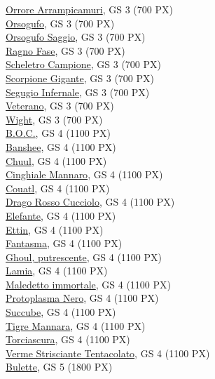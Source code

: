 \begin{multicols}{3}
{\hyperlink{Orrore Arrampicamuri}{Orrore Arrampicamuri}, GS 3 (700 PX)\\
\hyperlink{Orsogufo}{Orsogufo}, GS 3 (700 PX)\\
\hyperlink{Orsogufo Saggio}{Orsogufo Saggio}, GS 3 (700 PX)\\
\hyperlink{Ragno Fase}{Ragno Fase}, GS 3 (700 PX)\\
\hyperlink{Scheletro Campione}{Scheletro Campione}, GS 3 (700 PX)\\
\hyperlink{Scorpione Gigante}{Scorpione Gigante}, GS 3 (700 PX)\\
\hyperlink{Segugio Infernale}{Segugio Infernale}, GS 3 (700 PX)\\
\hyperlink{Veterano}{Veterano}, GS 3 (700 PX)\\
\hyperlink{Wight}{Wight}, GS 3 (700 PX)\\
\hyperlink{B.O.C.}{B.O.C.}, GS 4 (1100 PX)\\
\hyperlink{Banshee}{Banshee}, GS 4 (1100 PX)\\
\hyperlink{Chuul}{Chuul}, GS 4 (1100 PX)\\
\hyperlink{Cinghiale Mannaro}{Cinghiale Mannaro}, GS 4 (1100 PX)\\
\hyperlink{Couatl}{Couatl}, GS 4 (1100 PX)\\
\hyperlink{Drago Rosso Cucciolo}{Drago Rosso Cucciolo}, GS 4 (1100 PX)\\
\hyperlink{Elefante}{Elefante}, GS 4 (1100 PX)\\
\hyperlink{Ettin}{Ettin}, GS 4 (1100 PX)\\
\hyperlink{Fantasma}{Fantasma}, GS 4 (1100 PX)\\
\hyperlink{Ghoul, putrescente}{Ghoul, putrescente}, GS 4 (1100 PX)\\
\hyperlink{Lamia}{Lamia}, GS 4 (1100 PX)\\
\hyperlink{Maledetto immortale}{Maledetto immortale}, GS 4 (1100 PX)\\
\hyperlink{Protoplasma Nero}{Protoplasma Nero}, GS 4 (1100 PX)\\
\hyperlink{Succube}{Succube}, GS 4 (1100 PX)\\
\hyperlink{Tigre Mannara}{Tigre Mannara}, GS 4 (1100 PX)\\
\hyperlink{Torciascura}{Torciascura}, GS 4 (1100 PX)\\
\hyperlink{Verme Strisciante Tentacolato}{Verme Strisciante Tentacolato}, GS 4 (1100 PX)\\
\hyperlink{Bulette}{Bulette}, GS 5 (1800 PX)\\
}
\end{multicols}
